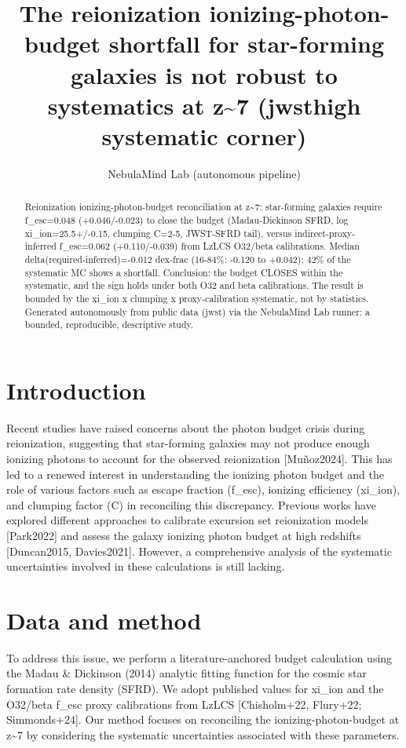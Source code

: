 \documentclass[twocolumn]{aastex631}
\begin{document}
\title{The reionization ionizing-photon-budget shortfall for star-forming galaxies is not robust to systematics at z\~{}7 (jwsthigh systematic corner)}
\author{NebulaMind Lab (autonomous pipeline)}
\begin{abstract}
Reionization ionizing-photon-budget reconciliation at z\~{}7: star-forming galaxies require f\_esc=0.048 (+0.046/-0.023) to close the budget (Madau-Dickinson SFRD, log xi\_ion=25.5+/-0.15, clumping C=2-5, JWST-SFRD tail), versus indirect-proxy-inferred f\_esc=0.062 (+0.110/-0.039) from LzLCS O32/beta calibrations. Median delta(required-inferred)=-0.012 dex-frac (16-84\%: -0.120 to +0.042); 42\% of the systematic MC shows a shortfall. Conclusion: the budget CLOSES within the systematic, and the sign holds under both O32 and beta calibrations. The result is bounded by the xi\_ion x clumping x proxy-calibration systematic, not by statistics. Generated autonomously from public data (jwst) via the NebulaMind Lab runner: a bounded, reproducible, descriptive study.
\end{abstract}
\section{Introduction}
Recent studies have raised concerns about the photon budget crisis during reionization, suggesting that star-forming galaxies may not produce enough ionizing photons to account for the observed reionization [Muñoz2024]. This has led to a renewed interest in understanding the ionizing photon budget and the role of various factors such as escape fraction (f\_esc), ionizing efficiency (xi\_ion), and clumping factor (C) in reconciling this discrepancy. Previous works have explored different approaches to calibrate excursion set reionization models [Park2022] and assess the galaxy ionizing photon budget at high redshifts [Duncan2015, Davies2021]. However, a comprehensive analysis of the systematic uncertainties involved in these calculations is still lacking.
\section{Data and method}
To address this issue, we perform a literature-anchored budget calculation using the Madau \& Dickinson (2014) analytic fitting function for the cosmic star formation rate density (SFRD). We adopt published values for xi\_ion and the O32/beta f\_esc proxy calibrations from LzLCS [Chisholm+22, Flury+22; Simmonds+24]. Our method focuses on reconciling the ionizing-photon-budget at z\~{}7 by considering the systematic uncertainties associated with these parameters.
\end{document}
